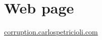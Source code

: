 \chapter*{Web page}


\begin{center}
\Large{\href{http://corruption.carlospetricioli.com}{corruption.carlospetricioli.com}}
\end{center}
\normalsize

\newpage


%  
% 
\thispagestyle{plain}
